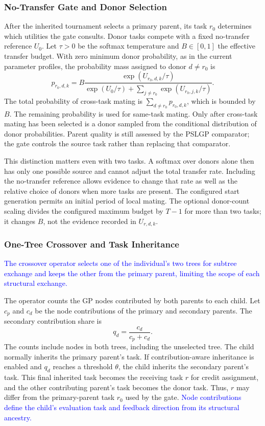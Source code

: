 \documentclass[10pt,journal]{IEEEtran}
\newcommand{\revision}[1]{\textcolor{blue}{#1}}
\begin{document}
\subsubsection{No-Transfer Gate and Donor Selection}
After the inherited tournament selects a primary parent, its task $r_0$ determines which utilities the gate consults. Donor tasks compete with a fixed no-transfer reference $U_0$. Let $\tau>0$ be the softmax temperature and $B\in[0,1]$ the effective transfer budget. With zero minimum donor probability, as in the current parameter profiles, the probability mass assigned to donor $d\ne r_0$ is
\begin{equation}
 p_{r_0,d,k}=B\frac{\exp(U_{r_0,d,k}/\tau)}
 {\exp(U_0/\tau)+\sum_{j\ne r_0}\exp(U_{r_0,j,k}/\tau)}.
 \label{eq:probability}
\end{equation}
The total probability of cross-task mating is $\sum_{d\ne r_0}p_{r_0,d,k}$, which is bounded by $B$. The remaining probability is used for same-task mating. Only after cross-task mating has been selected is a donor sampled from the conditional distribution of donor probabilities. Parent quality is still assessed by the PSLGP comparator; the gate controls the source task rather than replacing that comparator.

This distinction matters even with two tasks. A softmax over donors alone then has only one possible source and cannot adjust the total transfer rate. Including the no-transfer reference allows evidence to change that rate as well as the relative choice of donors when more tasks are present. The configured start generation permits an initial period of local mating. The optional donor-count scaling divides the configured maximum budget by $T-1$ for more than two tasks; it changes $B$, not the evidence recorded in $U_{r,d,k}$.

\subsubsection{One-Tree Crossover and Task Inheritance}
\revision{The crossover operator selects one of the individual's two trees for subtree exchange and keeps the other from the primary parent, limiting the scope of each structural exchange.}

The operator counts the GP nodes contributed by both parents to each child. Let $c_p$ and $c_d$ be the node contributions of the primary and secondary parents. The secondary contribution share is
\begin{equation}
    q_d=\frac{c_d}{c_p+c_d}.
\end{equation}
The counts include nodes in both trees, including the unselected tree. The child normally inherits the primary parent's task. If contribution-aware inheritance is enabled and $q_d$ reaches a threshold $\theta$, the child inherits the secondary parent's task. This final inherited task becomes the receiving task $r$ for credit assignment, and the other contributing parent's task becomes the donor task. Thus, $r$ may differ from the primary-parent task $r_0$ used by the gate. \revision{Node contributions define the child's evaluation task and feedback direction from its structural ancestry.}
\end{document}
